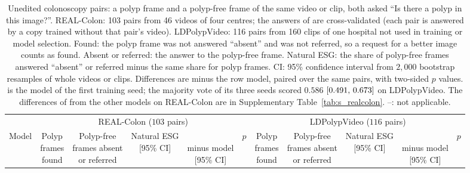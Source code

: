 \begin{table}[!t]
\caption{Unedited colonoscopy pairs: a polyp frame and a polyp-free frame of the same video or clip, both asked ``Is there a polyp in this image?''. REAL-Colon: 103 pairs from 46 videos of four centres; the answers of \msn{} are cross-validated (each pair is answered by a copy trained without that pair's video). LDPolypVideo: 116 pairs from 160 clips of one hospital not used in training or model selection. Found: the polyp frame was not answered ``absent'' and was not referred, so a request for a better image counts as found. Absent or referred: the answer to the polyp-free frame. Natural ESG: the share of polyp-free frames answered ``absent'' or referred minus the same share for polyp frames. CI: 95\% confidence interval from $2{,}000$ bootstrap resamples of whole videos or clips. Differences are \msn{} minus the row model, paired over the same pairs, with two-sided $p$ values. \msn{} is the model of the first training seed; the majority vote of its three seeds scored $0.586$ $[0.491,\,0.673]$ on LDPolypVideo. The differences of \ms{} from the other models on REAL-Colon are in Supplementary Table~\ref{tab:s_realcolon}. --: not applicable.}
\label{tab:natural}
\centering
\footnotesize
\setlength{\tabcolsep}{3.5pt}
\providecommand{\cistack}[2]{\begin{tabular}[t]{@{}c@{}}#1\\#2\end{tabular}}
\begin{adjustbox}{max width=\textwidth}
\begin{tabular}{l ccccc ccccc}
\toprule
 & \multicolumn{5}{c}{REAL-Colon ($103$ pairs)} & \multicolumn{5}{c}{LDPolypVideo ($116$ pairs)} \\
\cmidrule(lr){2-6}\cmidrule(lr){7-11}
Model & \shortstack{Polyp\\frames\\found} & \shortstack{Polyp-free\\frames absent\\or referred} & \shortstack{Natural ESG\\{}[95\% CI]} & \shortstack{\msn{}\\minus model\\{}[95\% CI]} & $p$ & \shortstack{Polyp\\frames\\found} & \shortstack{Polyp-free\\frames absent\\or referred} & \shortstack{Natural ESG\\{}[95\% CI]} & \shortstack{\msn{}\\minus model\\{}[95\% CI]} & $p$ \\

\end{tabular}
\end{adjustbox}
\end{table}
